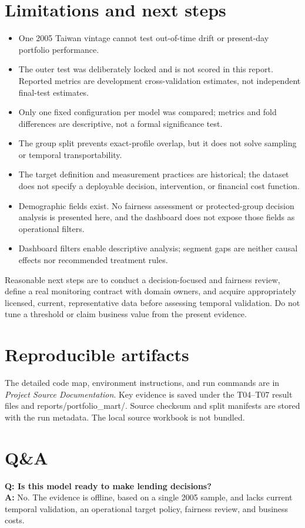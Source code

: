 \documentclass[11pt,letterpaper]{article}
\begin{document}
\section{Limitations and next steps}
\begin{itemize}
  \item One 2005 Taiwan vintage cannot test out-of-time drift or present-day portfolio performance.
  \item The outer test was deliberately locked and is not scored in this report. Reported metrics are development cross-validation estimates, not independent final-test estimates.
  \item Only one fixed configuration per model was compared; metrics and fold differences are descriptive, not a formal significance test.
  \item The group split prevents exact-profile overlap, but it does not solve sampling or temporal transportability.
  \item The target definition and measurement practices are historical; the dataset does not specify a deployable decision, intervention, or financial cost function.
  \item Demographic fields exist. No fairness assessment or protected-group decision analysis is presented here, and the dashboard does not expose those fields as operational filters.
  \item Dashboard filters enable descriptive analysis; segment gaps are neither causal effects nor recommended treatment rules.
\end{itemize}

Reasonable next steps are to conduct a decision-focused and fairness review, define a real monitoring contract with domain owners, and acquire appropriately licensed, current, representative data before assessing temporal validation. Do not tune a threshold or claim business value from the present evidence.

\section{Reproducible artifacts}
The detailed code map, environment instructions, and run commands are in \emph{Project Source Documentation}. Key evidence is saved under the T04--T07 result files and reports/portfolio\_mart/. Source checksum and split manifests are stored with the run metadata. The local source workbook is not bundled.

\section{Q\&A}
\textbf{Q: Is this model ready to make lending decisions?}\\
\textbf{A:} No. The evidence is offline, based on a single 2005 sample, and lacks current temporal validation, an operational target policy, fairness review, and business costs.
\end{document}
